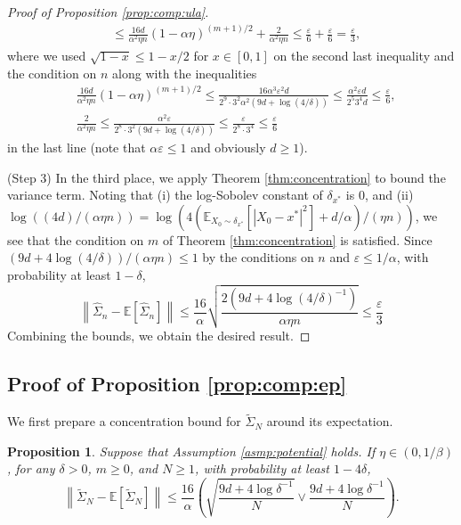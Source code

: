 \documentclass[12pt,reqno]{amsart}
\newtheorem{proposition}[theorem]{Proposition}
\theoremstyle{remark}
\theoremstyle{definition}
\newcommand{\E}{\mathbb{E}}
\renewcommand{\epsilon}{\varepsilon}
\begin{document}
\begin{proof}[Proof of Proposition \ref{prop:comp:ula}]
\begin{align*}
    &\le \frac{16d}{\alpha^{2}\eta n}(1-\alpha\eta)^{(m+1)/2}+\frac{2}{\alpha^{2}\eta n}
    \le \frac{\epsilon}{6}+\frac{\epsilon}{6}=\frac{\epsilon}{3},
\end{align*}
where we used $\sqrt{1-x}\le 1-x/2$ for $x\in[0,1]$ on the second last inequality and the condition on $n$ along with the inequalities
\begin{align*}
    &\frac{16d}{\alpha^{2}\eta n}(1-\alpha\eta)^{(m+1)/2}\le\frac{16\alpha^{3}\epsilon^{2}d}{2^{9}\cdot 3^{2}\alpha^{2}(9d+\log(4/\delta))}\le \frac{\alpha^{2}\epsilon d}{2^{5}3^{4}d}\le \frac{\epsilon}{6},\\
    &\frac{2}{\alpha^{2}\eta n}\le \frac{\alpha^{2} \epsilon}{2^8\cdot 3^2(9d+\log(4/\delta))}\le \frac{\epsilon}{2^8\cdot 3^4}\le \frac{\epsilon}{6}
\end{align*} 
in the last line (note that $\alpha\epsilon\le 1$ and obviously $d\ge 1$).

(Step 3) In the third place, we apply Theorem \ref{thm:concentration} to bound the variance term.
Noting that (i) the log-Sobolev constant of $\delta_{x^{\ast}}$ is $0$, and (ii) $\log((4d)/(\alpha\eta n))=\log(4(\E_{X_{0}\sim\delta_{x^{\ast}}}[|X_{0}-x^{\ast}|^{2}]+d/\alpha)/(\eta n))$, we see that the condition on $m$ of Theorem \ref{thm:concentration} is satisfied.
Since $(9d+4\log(4/\delta))/(\alpha\eta n)\le 1$ by the conditions on $n$ and $\epsilon\le 1/\alpha$, with probability at least $1-\delta$,
\begin{equation*}
    \left\|\hat{\Sigma}_{n}-\E\left[\hat{\Sigma}_{n}\right]\right\|\le \frac{16}{\alpha}\sqrt{\frac{2(9d+4\log(4/\delta)^{-1})}{\alpha\eta n}}\le \frac{\epsilon}{3}
\end{equation*}
Combining the bounds, we obtain the desired result.
\end{proof}

\subsection{Proof of Proposition \ref{prop:comp:ep}}
We first prepare a concentration bound for $\tilde{\Sigma}_{N}$ around its expectation.
\begin{proposition}\label{prop:concentration:ep}
    Suppose that Assumption \ref{asmp:potential} holds.
    If $\eta\in(0,1/\beta)$, for any $\delta>0$, $m\ge0$, and $N\ge1$, with probability at least $1-4\delta$,
    \begin{equation*}
        \left\|\tilde{\Sigma}_{N}-\E\left[\tilde{\Sigma}_{N}\right]\right\|\le \frac{16}{\alpha}\left(\sqrt{\frac{9d+4\log\delta^{-1}}{N}}\vee \frac{9d+4\log\delta^{-1}}{N}\right).
    \end{equation*}
\end{proposition}
\end{document}
